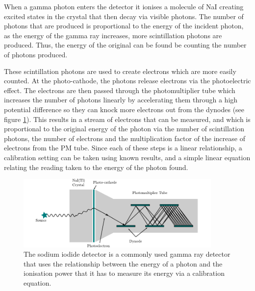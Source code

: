 When a gamma photon enters the detector it ionises a molecule of NaI creating excited states in the crystal that then decay via visible photons. The number of photons that are produced is proportional to the energy of the incident photon, as the energy of the gamma ray increases, more scintillation photons are produced. Thus, the energy of the original can be found be counting the number of photons produced. 

These scintillation photons are used to create electrons which are more easily counted. At the photo-cathode, the photons release electrons via the photoelectric effect. The electrons are then passed through the photomultiplier tube which increases the number of photons linearly by accelerating them through a high potential difference so they can knock more electrons out from the dynodes (see figure \ref{fig:naidetctor}). This results in a stream of electrons that can be measured, and which is proportional to the original energy of the photon via the number of scintillation photons, the number of electrons and the multiplication factor of the increase of electrons from the PM tube. Since each of these steps is a linear relationship, a calibration setting can be taken using known results, and a simple linear equation relating the reading taken to the energy of the photon found.
\begin{figure}[ht]
	\centering
	\includegraphics[width=0.9\textwidth]{NaIdetector.pdf}
	\caption{The sodium iodide detector is a commonly used gamma ray detector that uses the relationship between the energy of a photon and the ionisation power that it has to measure its energy via a calibration equation.\label{fig:naidetctor}}
\end{figure}

